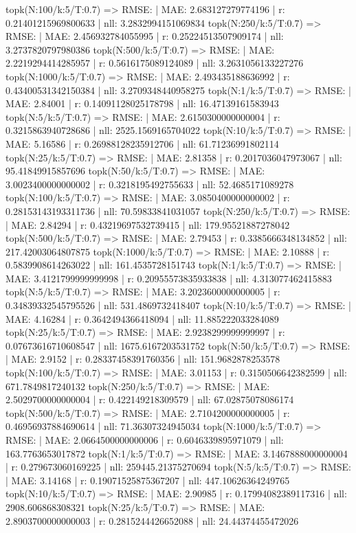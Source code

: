 topk(N:100/k:5/T:0.7) => RMSE: | MAE: 2.683127279774196 | r: 0.21401215969800633 | nll: 3.2832994151069834
topk(N:250/k:5/T:0.7) => RMSE: | MAE: 2.456932784055995 | r: 0.25224513507909174 | nll: 3.2737820797980386
topk(N:500/k:5/T:0.7) => RMSE: | MAE: 2.2219294414285957 | r: 0.5616175089124089 | nll: 3.2631056133227276
topk(N:1000/k:5/T:0.7) => RMSE: | MAE: 2.493435188636992 | r: 0.43400531342150384 | nll: 3.2709348440958275
topk(N:1/k:5/T:0.7) => RMSE: | MAE: 2.84001 | r: 0.14091128025178798 | nll: 16.47139161583943
topk(N:5/k:5/T:0.7) => RMSE: | MAE: 2.6150300000000004 | r: 0.3215863940728686 | nll: 2525.1569165704022
topk(N:10/k:5/T:0.7) => RMSE: | MAE: 5.16586 | r: 0.26988128235912706 | nll: 61.71236991802114
topk(N:25/k:5/T:0.7) => RMSE: | MAE: 2.81358 | r: 0.2017036047973067 | nll: 95.41849915857696
topk(N:50/k:5/T:0.7) => RMSE: | MAE: 3.0023400000000002 | r: 0.3218195492755633 | nll: 52.4685171089278
topk(N:100/k:5/T:0.7) => RMSE: | MAE: 3.0850400000000002 | r: 0.28153143193311736 | nll: 70.59833841031057
topk(N:250/k:5/T:0.7) => RMSE: | MAE: 2.84294 | r: 0.43219697532739415 | nll: 179.95521887278042
topk(N:500/k:5/T:0.7) => RMSE: | MAE: 2.79453 | r: 0.3385666348134852 | nll: 217.42003064807875
topk(N:1000/k:5/T:0.7) => RMSE: | MAE: 2.10888 | r: 0.5839908614263022 | nll: 161.4535728151743
topk(N:1/k:5/T:0.7) => RMSE: | MAE: 3.4121799999999998 | r: 0.20955573835933838 | nll: 4.313077462415883
topk(N:5/k:5/T:0.7) => RMSE: | MAE: 3.2023600000000005 | r: 0.34839332545795526 | nll: 531.4869732418407
topk(N:10/k:5/T:0.7) => RMSE: | MAE: 4.16284 | r: 0.3642494366418094 | nll: 11.885222033284089
topk(N:25/k:5/T:0.7) => RMSE: | MAE: 2.9238299999999997 | r: 0.07673616710608547 | nll: 1675.6167203531752
topk(N:50/k:5/T:0.7) => RMSE: | MAE: 2.9152 | r: 0.28337458391760356 | nll: 151.9682878253578
topk(N:100/k:5/T:0.7) => RMSE: | MAE: 3.01153 | r: 0.3150506642382599 | nll: 671.7849817240132
topk(N:250/k:5/T:0.7) => RMSE: | MAE: 2.5029700000000004 | r: 0.422149218309579 | nll: 67.02875078086174
topk(N:500/k:5/T:0.7) => RMSE: | MAE: 2.7104200000000005 | r: 0.46956937884690614 | nll: 71.36307324945034
topk(N:1000/k:5/T:0.7) => RMSE: | MAE: 2.0664500000000006 | r: 0.6046339895971079 | nll: 163.7763653017872
topk(N:1/k:5/T:0.7) => RMSE: | MAE: 3.1467888000000004 | r: 0.279673060169225 | nll: 259445.21375270694
topk(N:5/k:5/T:0.7) => RMSE: | MAE: 3.14168 | r: 0.19071525875367207 | nll: 447.10626364249765
topk(N:10/k:5/T:0.7) => RMSE: | MAE: 2.90985 | r: 0.17994082389117316 | nll: 2908.606868308321
topk(N:25/k:5/T:0.7) => RMSE: | MAE: 2.8903700000000003 | r: 0.2815244426652088 | nll: 24.44374455472026
